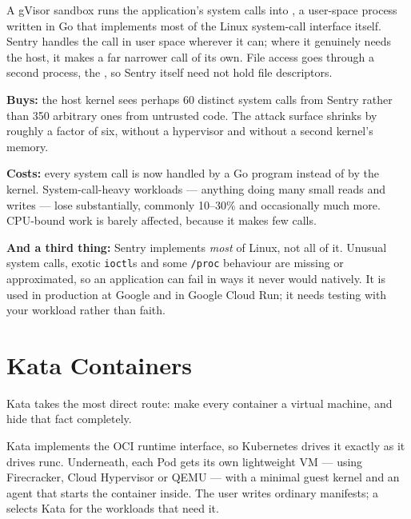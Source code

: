 A gVisor sandbox runs the application's system calls into , a
user-space process written in Go that implements most of the Linux system-call
interface itself. Sentry handles the call in user space wherever it can; where
it genuinely needs the host, it makes a far narrower call of its own. File
access goes through a second process, the , so Sentry itself need
not hold file descriptors.

\begin{conceptbox}
\textbf{Buys:} the host kernel sees perhaps 60 distinct system calls from
Sentry rather than 350 arbitrary ones from untrusted code. The attack surface
shrinks by roughly a factor of six, without a hypervisor and without a second
kernel's memory.

\smallskip
\textbf{Costs:} every system call is now handled by a Go program instead of by
the kernel. System-call-heavy workloads --- anything doing many small reads and
writes --- lose substantially, commonly 10--30\% and occasionally much more.
CPU-bound work is barely affected, because it makes few calls.

\smallskip
\textbf{And a third thing:} Sentry implements \emph{most} of Linux, not all of
it. Unusual system calls, exotic \texttt{ioctl}s and some \texttt{/proc}
behaviour are missing or approximated, so an application can fail in ways it
never would natively. It is used in production at Google and in Google Cloud
Run; it needs testing with your workload rather than faith.
\end{conceptbox}

\section{Kata Containers}

Kata takes the most direct route: make every container a virtual machine, and
hide that fact completely.

Kata implements the OCI runtime interface, so Kubernetes drives it exactly as
it drives runc. Underneath, each Pod gets its own lightweight VM --- using
Firecracker, Cloud Hypervisor or QEMU --- with a minimal guest kernel and an
agent that starts the container inside. The user writes ordinary manifests; a
 selects Kata for the workloads that need it.

